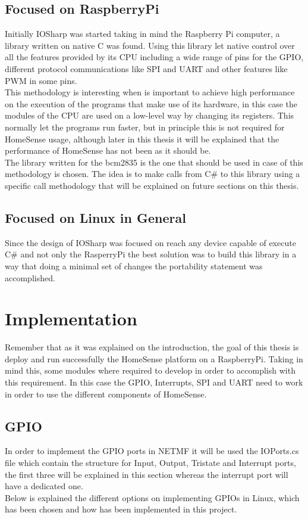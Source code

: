 \subsection{Focused on RaspberryPi}\label{SS:IOSharp-RPI}
Initially IOSharp was started taking in mind the Raspberry Pi computer, a library written on native C was found. Using this library let native control over all the features provided by its CPU including a wide range of pins for the GPIO, different protocol communications like \gls{SPI} and \gls{UART} and other features like \gls{PWM} in some pins.
\\
This methodology is interesting when is important to achieve high performance on the execution of the programs that make use of its hardware, in this case the modules of the CPU are used on a low-level way by changing its registers. This normally let the programs run faster, but in principle this is not required for HomeSense usage, although later in this thesis it will be explained that the performance of HomeSense has not been as it should be.
\\
The library written for the bcm2835 is the one that should be used in case of this methodology is chosen. The idea is to make calls from C\# to this library using a specific call methodology that will be explained on future sections on this thesis.

\subsection{Focused on Linux in General}\label{SS:IOSharp-Linux}
Since the design of IOSharp was focused on reach any device capable of execute C\# and not only the RasperryPi the best solution was to build this library in a way that doing a minimal set of changes the portability statement was accomplished.

\section{Implementation}\label{S:Implementation}
Remember that as it was explained on the introduction, the goal of this thesis is deploy and run successfully the HomeSense platform on a RaspberryPi. Taking in mind this, some modules where required to develop in order to accomplish with this requirement. In this case the GPIO, Interrupts, SPI and UART need to work in order to use the different components of HomeSense.

\subsection{GPIO}\label{SS:GPIO}
In order to implement the GPIO ports in NETMF it will be used the IOPorts.cs file which contain the structure for Input, Output, Tristate and Interrupt ports, the first three will be explained in this section whereas the interrupt port will have a dedicated one.
\\
Below is explained the different options on implementing GPIOs in Linux, which has been chosen and how has been implemented in this project.

